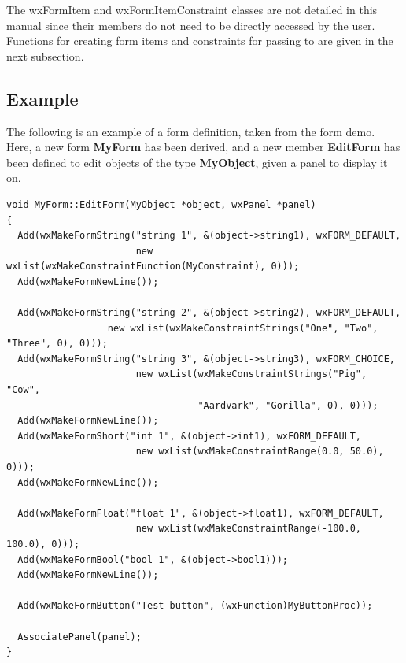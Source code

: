 \begin{twocollist}\itemsep=0pt
\end{twocollist}

The wxFormItem and wxFormItemConstraint classes are not detailed in this
manual since their members do not need to be directly accessed by the
user. Functions for creating form items and constraints for passing to
 are given in the next subsection.

\subsection{Example}

The following is an example of a form definition, taken from the form demo.
Here, a new form {\bf MyForm} has been derived, and a new member {\bf
EditForm} has been defined to edit objects of the type {\bf MyObject},
given a panel to display it on.

\begin{verbatim}
void MyForm::EditForm(MyObject *object, wxPanel *panel)
{
  Add(wxMakeFormString("string 1", &(object->string1), wxFORM_DEFAULT,
                       new wxList(wxMakeConstraintFunction(MyConstraint), 0)));
  Add(wxMakeFormNewLine());

  Add(wxMakeFormString("string 2", &(object->string2), wxFORM_DEFAULT,
                  new wxList(wxMakeConstraintStrings("One", "Two", "Three", 0), 0)));
  Add(wxMakeFormString("string 3", &(object->string3), wxFORM_CHOICE,
                       new wxList(wxMakeConstraintStrings("Pig", "Cow",
                                  "Aardvark", "Gorilla", 0), 0)));
  Add(wxMakeFormNewLine());
  Add(wxMakeFormShort("int 1", &(object->int1), wxFORM_DEFAULT,
                       new wxList(wxMakeConstraintRange(0.0, 50.0), 0)));
  Add(wxMakeFormNewLine());

  Add(wxMakeFormFloat("float 1", &(object->float1), wxFORM_DEFAULT,
                       new wxList(wxMakeConstraintRange(-100.0, 100.0), 0)));
  Add(wxMakeFormBool("bool 1", &(object->bool1)));
  Add(wxMakeFormNewLine());

  Add(wxMakeFormButton("Test button", (wxFunction)MyButtonProc));

  AssociatePanel(panel);
}
\end{verbatim}

